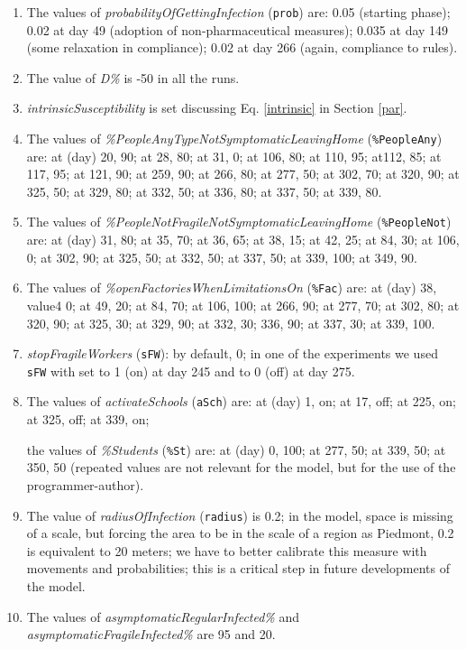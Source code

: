 \documentclass[graybox]{svmult}
\begin{document}
\begin{enumerate}[label=\roman*]

\item \label{pp1} The values of \emph{probabilityOfGettingInfection} (\verb|prob|) are: 0.05 (starting phase); 0.02 at day 49 (adoption of non-pharmaceutical measures); 0.035 at day 149 (some relaxation in compliance); 0.02 at day 266 (again, compliance to rules). 

\item \label{pD} The value of \emph{D\%} is -50 in all the runs.

\item \label{pp2} \emph{intrinsicSusceptibility} is set discussing Eq. \ref{intrinsic} in Section \ref{par}.

\item \label{pp3} The values of \emph{\%PeopleAnyTypeNotSymptomaticLeavingHome} (\verb|%PeopleAny|) are:
at (day) 20, 90; at 28, 80; at 31, 0; at 106, 80; at 110, 95; at112, 85; at 117, 95; at 121, 90; at 259, 90; at 266, 80; at 277, 50;
at 302, 70; at 320, 90; at 325, 50; at 329, 80; at 332, 50; at 336, 80; at 337, 50; at 339, 80.

\item \label{pp4} The values of \emph{\%PeopleNotFragileNotSymptomaticLeavingHome} (\verb|%PeopleNot|) are:
at (day) 31, 80; at 35, 70; at 36, 65; at 38, 15; at 42, 25; at 84, 30; at 106, 0; at 302, 90; at 325, 50; at 332, 50; 
at 337, 50; at 339, 100; at 349, 90.

\item \label{pp5} The values of \emph{\%openFactoriesWhenLimitationsOn} (\verb|%Fac|) are:
at (day) 38, value4 0; at 49, 20; at 84, 70; at 106, 100; at 266, 90; at 277, 70; at 302, 80; at 320, 90; at 325, 30;
at 329, 90; at 332, 30; 336, 90; at 337, 30; at 339, 100.

\item \label{pp6} \emph{stopFragileWorkers} (\verb|sFW|): by default, 0; in one of the experiments we used \verb|sFW| with set to 1 (on) at day 245 and to 0 (off) at day 275.

\item \label{pp7} The values of \emph{activateSchools} (\verb|aSch|) are:
at (day) 1, on; at 17, off; at 225, on; at 325, off; at 339, on;

the values of \emph{\%Students} (\verb|%St|) are: 
at (day) 0, 100; at 277, 50; at 339, 50; at 350, 50 (repeated values are not relevant for the model, but for the use of the programmer-author).

\item \label{pp8} The value of \emph{radiusOfInfection} (\verb|radius|) is 0.2; in the model, space is missing of a scale, but forcing the area to be in the scale of a region as Piedmont, 0.2 is equivalent to 20 meters; we have to better calibrate this measure with movements and probabilities; this is a critical step in future developments of the model.

\item \label{pp9} The values of \emph{asymptomaticRegularInfected\%} and \emph{asymptomaticFragileInfected\%} are 95 and 20.

\end{enumerate}
\end{document}
